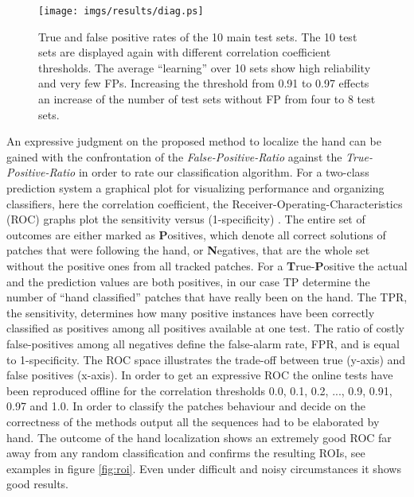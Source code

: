 \documentclass[conference]{IEEEtran}
\begin{document}
%
\begin{figure}
	\begin{center}
		\texttt{[image: imgs/results/diag.ps]}
			\caption[True and false positive rates of the 10 main test sets. ]{True and false positive rates of the 10 main test sets. The 10 test sets are displayed again with different correlation coefficient thresholds. The average ``learning'' over 10 sets show high reliability and very few FPs. Increasing the threshold from 0.91 to 0.97 effects an increase of the number of test sets without FP from four to 8 test sets.}
			\label{fig:result:diag}
	\end{center}
\end{figure}
%
%
An expressive judgment on the proposed method to localize the hand can be gained with the confrontation of the \textit{False-Positive-Ratio} against the \textit{True-Positive-Ratio} in order to rate our classification algorithm. For a two-class prediction system a graphical plot for visualizing performance and organizing classifiers, here the correlation coefficient, the Receiver-Operating-Characteristics (ROC) graphs plot the sensitivity versus (1-specificity) \cite{ROC04-03}. The entire set of outcomes are either marked as \textbf{P}ositives, which denote all correct solutions of patches that were following the hand, or \textbf{N}egatives, that are the whole set without the positive ones from all tracked patches. %
For a \textbf{T}rue-\textbf{P}ositive the actual and the prediction values are both positives, in our case TP determine the number of ``hand classified'' patches that have really been on the hand. %
The TPR, the sensitivity, determines how many positive instances have been correctly classified as positives among all positives available at one test. The ratio of costly false-positives among all negatives define the false-alarm rate, FPR, and is equal to 1-specificity. %
The ROC space illustrates the trade-off between true (y-axis) and false positives (x-axis). In order to get an expressive ROC the online tests have been reproduced offline for the correlation thresholds 0.0, 0.1, 0.2, ..., 0.9, 0.91, 0.97 and 1.0. In order to classify the patches behaviour and decide on the correctness of the methods output all the sequences had to be elaborated by hand. The outcome of the hand localization shows an extremely good ROC far away from any random classification and confirms the resulting ROIs, see examples in figure \ref{fig:roi}. Even under difficult and noisy circumstances it shows good results.
\end{document}
